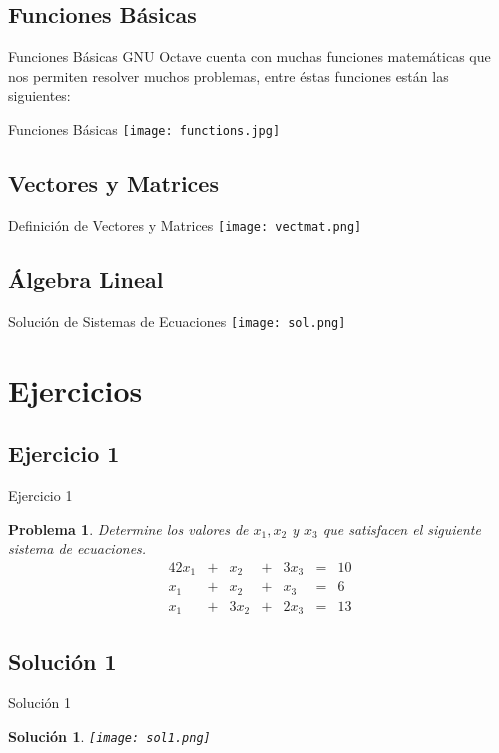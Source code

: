 \documentclass[12pt]{beamer}
\newtheorem{prob}{Problema}
\newtheorem{sol}{Solución}
\begin{document}
\subsection{Funciones Básicas}
\begin{frame}{Funciones Básicas}
GNU Octave cuenta con muchas funciones matemáticas que nos permiten resolver muchos problemas, entre éstas funciones están las siguientes:
\end{frame}
\begin{frame}{Funciones Básicas}
\texttt{[image: functions.jpg]}
\end{frame}
\subsection{Vectores y Matrices}
\begin{frame}{Definición de Vectores y Matrices}
\texttt{[image: vectmat.png]}
\end{frame}
\subsection{Álgebra Lineal}
\begin{frame}{Solución de Sistemas de Ecuaciones}
	\texttt{[image: sol.png]}
\end{frame}
\section{Ejercicios}
\subsection{Ejercicio 1}
\begin{frame}{Ejercicio 1}
\begin{prob}
Determine los valores de $x_1, x_2$ y $x_3$ que satisfacen el siguiente sistema de ecuaciones.	
\begin{alignat*}{4}
2x_1 & {}+{} &  x_2 & {}+{} & 3x_3 & {}={} & 10 \\
x_1 & {}+{} &  x_2 & {}+{} &  x_3 & {}={} &  6 \\
x_1 & {}+{} & 3x_2 & {}+{} & 2x_3 & {}={} & 13
\end{alignat*}
\end{prob}
\end{frame}
\subsection{Solución 1}
\begin{frame}{Solución 1}
\begin{sol}
	\texttt{[image: sol1.png]}
\end{sol}
\end{frame}
\end{document}
